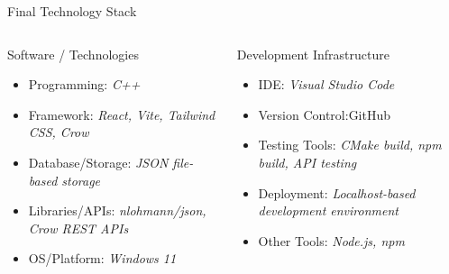 \documentclass[aspectratio=169,11pt]{beamer}
\newcommand{\placeholder}[1]{%
\textit{\color{GEUGrey}#1}
}
\begin{document}
\begin{frame}{Final Technology Stack}

\begin{columns}[T,totalwidth=\textwidth]


\begin{block}{Software / Technologies}
\begin{itemize}\itemsep2pt
    \item Programming: \placeholder{ C++}
    \item Framework: \placeholder{React, Vite, Tailwind CSS, Crow}
    \item Database/Storage: \placeholder{JSON file-based storage}
    \item Libraries/APIs: \placeholder{nlohmann/json, Crow REST APIs}
    \item OS/Platform: \placeholder{Windows 11}
\end{itemize}
\end{block}


\begin{block}{Development Infrastructure}
\begin{itemize}\itemsep2pt
    \item IDE: \placeholder{Visual Studio Code}
    \item Version Control:GitHub
    \item Testing Tools: \placeholder{CMake build, npm build, API testing}
    \item Deployment: \placeholder{Localhost-based development environment}
    \item Other Tools: \placeholder{Node.js, npm}
\end{itemize}
\end{block}

\end{columns}

\vfill
\end{frame}
\end{document}
